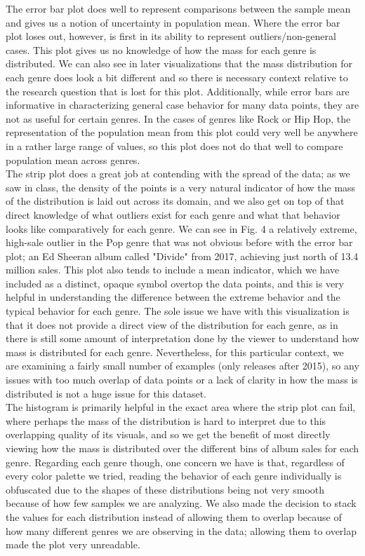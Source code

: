 The error bar plot does well to represent comparisons between the sample mean and gives us a notion of uncertainty in population mean. Where the error bar plot loses out, however, is first in its ability to represent outliers/non-general cases. This plot gives us no knowledge of how the mass for each genre is distributed. We can also see in later visualizations that the mass distribution for each genre does look a bit different and so there is necessary context relative to the research question that is lost for this plot. Additionally, while error bars are informative in characterizing general case behavior for many data points, they are not as useful for certain genres. In the cases of genres like Rock or Hip Hop, the representation of the population mean from this plot could very well be anywhere in a rather large range of values, so this plot does not do that well to compare population mean across genres.\\

The strip plot does a great job at contending with the spread of the data; as we saw in class, the density of the points is a very natural indicator of how the mass of the distribution is laid out across its domain, and we also get on top of that direct knowledge of what outliers exist for each genre and what that behavior looks like comparatively for each genre. We can see in Fig. 4 a relatively extreme, high-sale outlier in the Pop genre that was not obvious before with the error bar plot; an Ed Sheeran album called "Divide" from 2017, achieving just north of 13.4 million sales. This plot also tends to include a mean indicator, which we have included as a distinct, opaque symbol overtop the data points, and this is very helpful in understanding the difference between the extreme behavior and the typical behavior for each genre. The sole issue we have with this visualization is that it does not provide a direct view of the distribution for each genre, as in there is still some amount of interpretation done by the viewer to understand how mass is distributed for each genre. Nevertheless, for this particular context, we are examining a fairly small number of examples (only releases after 2015), so any issues with too much overlap of data points or a lack of clarity in how the mass is distributed is not a huge issue for this dataset.\\

The histogram is primarily helpful in the exact area where the strip plot can fail, where perhaps the mass of the distribution is hard to interpret due to this overlapping quality of its visuals, and so we get the benefit of most directly viewing how the mass is distributed over the different bins of album sales for each genre. Regarding each genre though, one concern we have is that, regardless of every color palette we tried, reading the behavior of each genre individually is obfuscated due to the shapes of these distributions being not very smooth because of how few samples we are analyzing. We also made the decision to stack the values for each distribution instead of allowing them to overlap because of how many different genres we are observing in the data; allowing them to overlap made the plot very unreadable.\\

